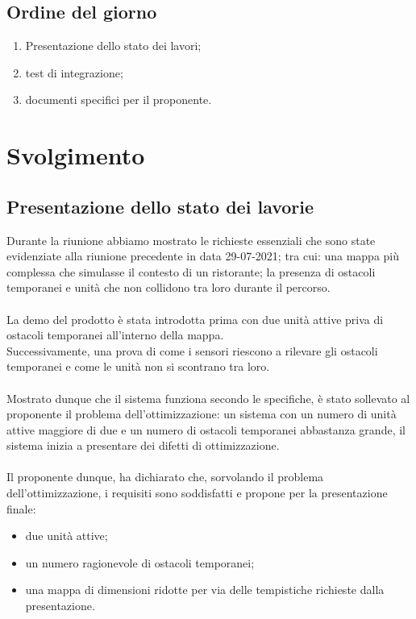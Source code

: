 \documentclass[]{article}
\begin{document}
	\subsection{Ordine del giorno}
	\begin{enumerate}
		\item Presentazione dello stato dei lavori;
		\item test di integrazione;
		\item documenti specifici per il proponente.
	\end{enumerate}
	\newpage
	\section{Svolgimento}


	\subsection{Presentazione dello stato dei lavorie}
	Durante la riunione abbiamo mostrato le richieste essenziali che sono state evidenziate alla riunione precedente in data 29-07-2021; tra cui: una mappa più complessa che simulasse il contesto di un ristorante; la presenza di ostacoli temporanei e unità che non collidono tra loro durante il percorso. \\\\
	La demo del prodotto è stata introdotta prima con due unità attive priva di ostacoli temporanei all'interno della mappa.\\
	Successivamente, una prova di come i sensori riescono a rilevare gli ostacoli temporanei e come le unità non si scontrano tra loro.\\\\
	Mostrato dunque che il sistema funziona secondo le specifiche, è stato sollevato al proponente il problema dell'ottimizzazione: un sistema con un numero di unità attive maggiore di due e un numero di ostacoli temporanei abbastanza grande, il sistema inizia a presentare dei difetti di ottimizzazione. \\\\
	Il proponente dunque, ha dichiarato che, sorvolando il problema dell'ottimizzazione, i requisiti sono soddisfatti e propone per la presentazione finale:
	\begin{itemize}
		\item due unità attive;
		\item un numero ragionevole di ostacoli temporanei;
		\item una mappa di dimensioni ridotte per via delle tempistiche richieste dalla presentazione.
	\end{itemize}
\end{document}
